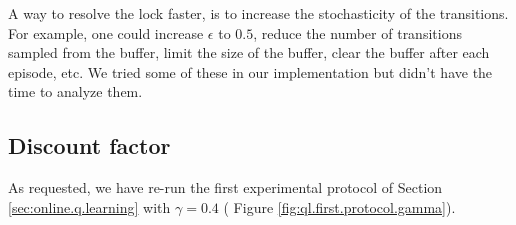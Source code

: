 \documentclass[a4paper, 12pt]{article}
\begin{document}
    A way to resolve the lock faster, is to increase the stochasticity of the transitions. For example, one could increase $\epsilon$ to $0.5$, reduce the number of transitions sampled from the buffer, limit the size of the buffer, clear the buffer after each episode, etc. We tried some of these in our implementation but didn't have the time to analyze them.
    
    \subsection{Discount factor}
    
    As requested, we have re-run the first experimental protocol of Section \ref{sec:online.q.learning} with $\gamma = \num{0.4}$ (\cf{} Figure \ref{fig:ql.first.protocol.gamma}).
    
\end{document}
